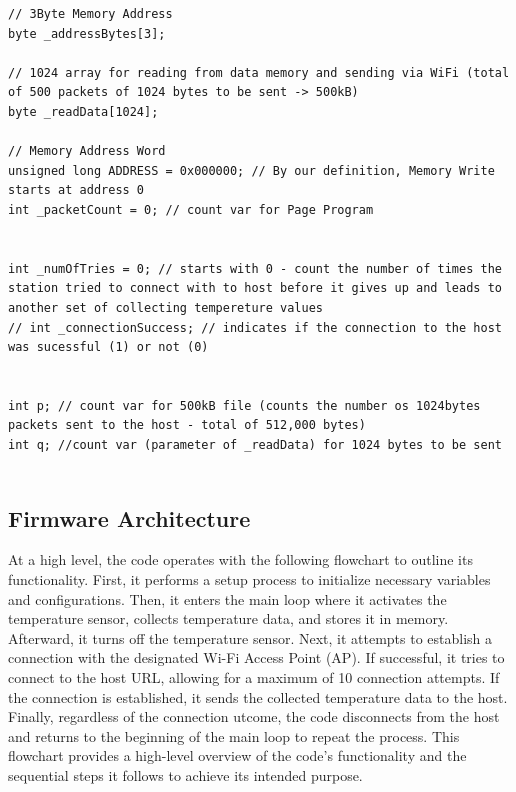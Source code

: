 \begin{lstlisting}[language=Arduino]
// 3Byte Memory Address
byte _addressBytes[3];

// 1024 array for reading from data memory and sending via WiFi (total of 500 packets of 1024 bytes to be sent -> 500kB)
byte _readData[1024];

// Memory Address Word
unsigned long ADDRESS = 0x000000; // By our definition, Memory Write starts at address 0
int _packetCount = 0; // count var for Page Program


int _numOfTries = 0; // starts with 0 - count the number of times the station tried to connect with to host before it gives up and leads to another set of collecting tempereture values
// int _connectionSuccess; // indicates if the connection to the host was sucessful (1) or not (0)


int p; // count var for 500kB file (counts the number os 1024bytes packets sent to the host - total of 512,000 bytes)
int q; //count var (parameter of _readData) for 1024 bytes to be sent


\end{lstlisting}






\subsection{Firmware Architecture}\label{04Sub:FirmwareArchitecture}

At a high level, the code operates with the following flowchart to outline its functionality. 
First, it performs a setup process to initialize necessary variables and configurations. Then, it enters 
the main loop where it activates the temperature sensor, collects temperature data, and stores it in memory. Afterward,
 it turns off the temperature sensor. Next, it attempts to establish a connection with the designated Wi-Fi Access Point 
 (AP). If successful, it tries to connect to the host URL, allowing for a maximum of 10 connection attempts. If the 
 connection is established, it sends the collected temperature data to the host. Finally, regardless of the connection 
 utcome, the code disconnects from the host and returns to the beginning of the main loop to repeat the process. This 
 flowchart provides a high-level overview of the code's functionality and the sequential steps it follows to achieve its 
 intended purpose.

